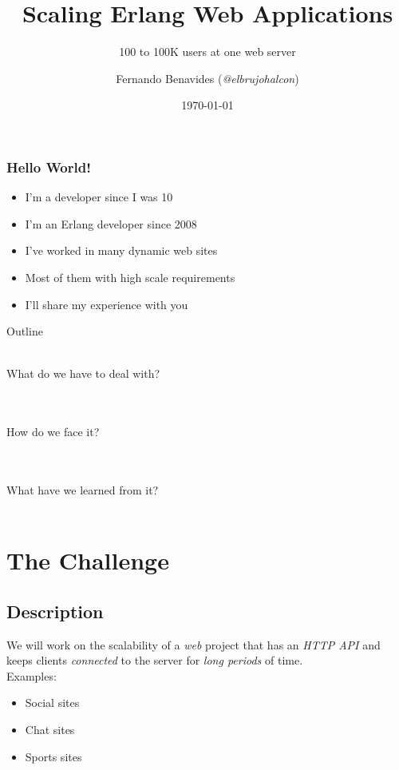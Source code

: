 \documentclass[utf8]{beamer}
\begin{document}
\title{Scaling Erlang Web Applications}
\subtitle{100 to 100K users at one web server}
\author{Fernando Benavides (\textit{@elbrujohalcon})}
\date{\today}


\frame{\titlepage} 

\begin{frame}
	\frametitle{Hello World!}
	\begin{itemize}
		\item<+-> I'm a developer since I was 10
		\item<+-> I'm an Erlang developer since 2008
		\item<+-> I've worked in many dynamic web sites
		\item<+-> Most of them with high scale requirements
		\item<+-> I'll share my experience with you 
	\end{itemize}
\end{frame}

\begin{frame}{Outline}
	\begin{description}
		\item<+->[The Challenge] {\ \\ What do we have to deal with? \\ \ }
		\item<+->[The Plan] {\ \\ How do we face it? \\ \  }
		\item<+->[The Tips and Tricks] {\ \\ What have we learned from it? \\ \ }
	\end{description}
\end{frame}

\section{The Challenge}
\subsection{Description}
\begin{frame}
	We will work on the scalability of a \emph{web} project \pause that has an \emph{HTTP API} \pause and keeps clients \emph{connected} to the server \pause for \emph{long periods} of time.\\
\pause Examples:
	\begin{itemize}
		\item Social sites
		\item Chat sites
		\item Sports sites
	\end{itemize}
\end{frame}
\end{document}
